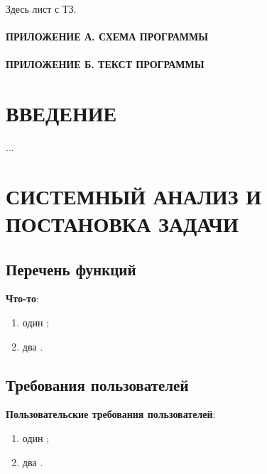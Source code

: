 \documentclass[
  12pt, %
  a4paper, %
  simple, %
  floatsection %
]{eskdtext}
\begin{document}
  

  Здесь лист с ТЗ.

  \newpage
  \tableofcontents
  \paragraph{ПРИЛОЖЕНИЕ А. СХЕМА ПРОГРАММЫ}
  \paragraph{ПРИЛОЖЕНИЕ Б. ТЕКСТ ПРОГРАММЫ}

  \newpage
  \section*{ВВЕДЕНИЕ}

  ...

  \newpage
  \section{СИСТЕМНЫЙ АНАЛИЗ И ПОСТАНОВКА ЗАДАЧИ}

  \subsection{Перечень функций}

  \textbf {Что-то}:
  \begin{enumerate}
    \item один ;
    \item два .
  \end{enumerate}

  \subsection{Требования пользователей}

  \textbf{Пользовательские требования пользователей}:
  \begin{enumerate}
    \item один ;
    \item два .
  \end{enumerate}
\end{document}
